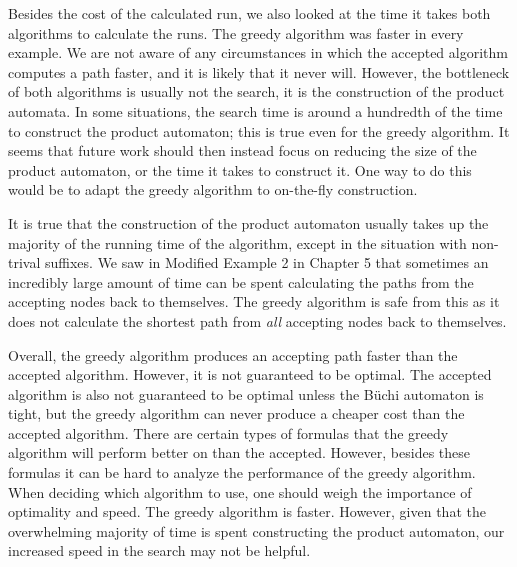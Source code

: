 Besides the cost of the calculated run, we also looked at the time it takes both algorithms to calculate the runs. The greedy algorithm was faster in every example. We are not aware of any circumstances in which the accepted algorithm computes a path faster, and it is likely that it never will. However, the bottleneck of both algorithms is usually not the search, it is the construction of the product automata. In some situations, the search time is around a hundredth of the time to construct the product automaton; this is true even for the greedy algorithm. It seems that future work should then instead focus on reducing the size of the product automaton, or the time it takes to construct it. One way to do this would be to adapt the greedy algorithm to on-the-fly construction. 

It is true that the construction of the product automaton usually takes up the majority of the running time of the algorithm, except in the situation with non-trival suffixes. We saw in Modified Example 2 in Chapter 5 that sometimes an incredibly large amount of time can be spent calculating the paths from the accepting nodes back to themselves. The greedy algorithm is safe from this as it does not calculate the shortest path from \textit{all} accepting nodes back to themselves. 

Overall, the greedy algorithm produces an accepting path faster than the accepted algorithm. However, it is not guaranteed to be optimal. The accepted algorithm is also not guaranteed to be optimal unless the B\"uchi automaton is tight, but the greedy algorithm can never produce a cheaper cost than the accepted algorithm. There are certain types of formulas that the greedy algorithm will perform better on than the accepted. However, besides these formulas it can be hard to analyze the performance of the greedy algorithm. When deciding which algorithm to use, one should weigh the importance of optimality and speed. The greedy algorithm is faster. However, given that the overwhelming majority of time is spent constructing the product automaton, our increased speed in the search may not be helpful.  